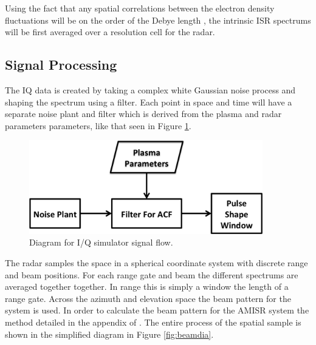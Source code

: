 \documentclass[draft,ras]{agutex}
\begin{document}
\begin{article}
Using the fact that any spatial correlations between the electron density fluctuations will be on the order of the Debye length \cite{farley1969}, the intrinsic ISR spectrums will be first averaged over a resolution cell for the radar. 

\subsection{Signal Processing}
The IQ data is created by taking a complex white Gaussian noise process and shaping the spectrum using a filter. Each point in space and time will have a separate noise plant and filter which is derived from the plasma and radar parameters parameters, like that seen in Figure \ref{fig:IQdiagram}. 
\begin{figure}[h!]
\centering
\includegraphics[width=4in]{diagrampart}
\caption{Diagram for I/Q simulator signal flow.}
\label{fig:IQdiagram}
\end{figure}

The radar samples the space in a spherical coordinate system with discrete range and beam positions. For each range gate and beam the different spectrums are averaged together together. In range this is simply a window the length of a range gate. Across the azimuth and elevation space the beam pattern for the system is used. In order to calculate the beam pattern for the AMISR system the method detailed in the appendix of \citep{RDS:RDS20236}. The entire process of the spatial sample is shown in the simplified diagram in Figure \ref{fig:beamdia}.



\end{article}
\end{document}
